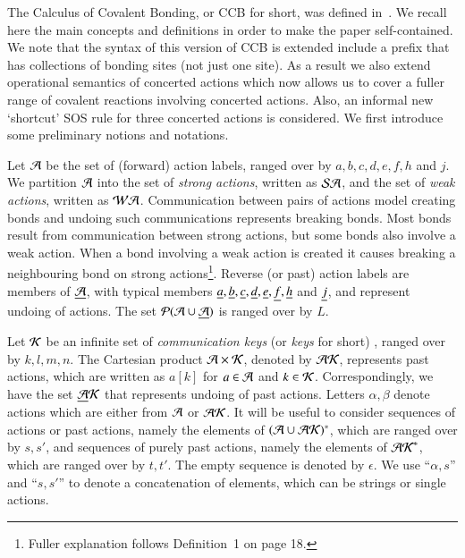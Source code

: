 %
The Calculus of Covalent Bonding, or CCB for short, was defined in~\cite{KU2017}. 
We recall here the main concepts and definitions in order to make the paper self-contained. 
We note that the syntax of this version of CCB is extended include a prefix that has collections of bonding sites 
(not just one site). As a result we also extend operational semantics of concerted actions 
which now allows us to cover a fuller range of covalent reactions involving concerted actions. 
Also, an informal new `shortcut'  SOS rule for three concerted actions is considered. 
We first introduce some preliminary notions and notations.

Let $\mathcal{A}$ be the set of (forward) action labels, 
ranged over by $a,b,c,d,e,f,h$ and $j$. We partition $\mathcal{A}$ into the set of \emph{strong actions}, written as
$\mathcal{SA}$, and the set of \emph{weak actions}, written as $\mathcal{WA}$. 
Communication between pairs of actions model creating bonds and undoing such communications represents breaking bonds. Most bonds result from communication between strong actions, but some bonds also involve a weak action. When a bond involving a weak action is created it causes breaking a neighbouring bond on strong actions\footnote{Fuller explanation follows Definition~1 on page 18.
}.
Reverse (or past) action labels are members of
$\underline{\mathcal{A}}$, with typical members $\underline {a},\underline {b}, \underline {c},\underline {d}, \underline {e} ,\underline {f}, \underline {h}$ and $\underline {j}$, and represent 
undoing of actions. The set $\mathcal{P}(\mathcal{A} \cup \underline{\mathcal{A}})$ is ranged over by $L$.

Let $\mathcal{K}$ be an infinite set of {\em communication keys} (or {\em keys} for short)
\cite{PhillipsUlidowski06,PHILLIPS200770}, ranged over by $k,l, m,n$. The Cartesian product $\mathcal A \times \mathcal{K}$, denoted by $\mathcal{AK}$,
 represents past actions, which are written as $a[k]$ for $a\in \mathcal{A}$ and $k\in\mathcal{K}$. 
Correspondingly, we have the set $\underline{\mathcal{A}}\mathcal{K}$ that represents undoing of past actions. Letters $\alpha, \beta$ denote actions which are either from $\mathcal{A}$ or $\mathcal{AK}$. It will be 
useful to consider sequences of actions or past actions, namely the elements of $(\mathcal{A} \cup \mathcal{AK})^*$, 
which are ranged over by $s,s'$, and sequences of purely past actions, namely the elements of $\mathcal{AK}^*$, 
which are ranged over by $t,t'$. The empty sequence is denoted by $\epsilon$. We use ``$\alpha, s$'' and
``$s,s'$'' to denote a concatenation of elements, which can be strings or single actions.

